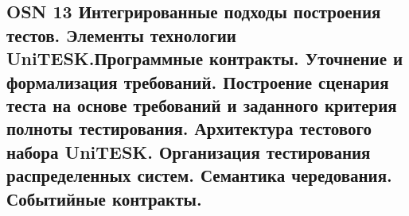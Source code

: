 \subsection{OSN 13 Интегрированные подходы построения тестов. Элементы технологии UniTESK.Программные контракты. Уточнение и формализация требований. Построение сценария теста на основе требований и заданного критерия полноты тестирования. Архитектура тестового набора UniTESK. Организация тестирования распределенных систем. Семантика чередования. Событийные контракты.}

